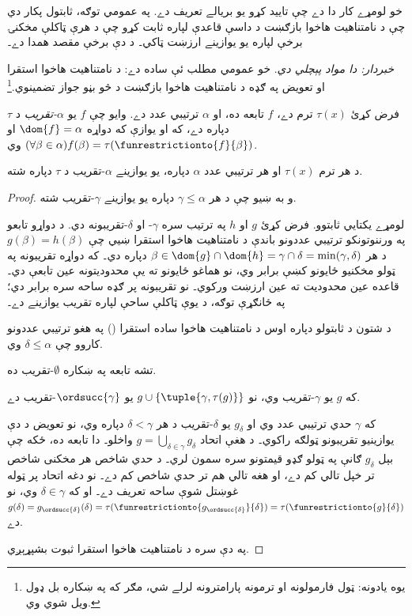 \documentclass[../../../include/open-logic-section]{subfiles}
\begin{document}

خو لومړے کار دا دے چې تاييد کړو
 يو بريالے تعريف دے. په عمومي توګه، ثابتول
پکار دي چې د نامتناهيت هاخوا بازګښت د داسې قاعدې لپاره ثابت کړو
چې د هرې ټاکلې مخکنۍ برخې لپاره يو يوازينے ارزښت ټاکي۔
د دې برخې مقصد همدا دے۔

\emph{خبردار: دا مواد پېچلي دي}. خو عمومي مطلب ئې ساده دے:
د نامتناهيت هاخوا استقرا او تعويض په ګډه د نامتناهيت هاخوا بازګښت د
څو بڼو جواز تضمينوي.\footnote{يوه يادونه: ټول فارمولونه او ترمونه
پارامترونه لرلے شي، مګر که په ښکاره بل ډول ويل شوي وي.}

\begin{defn}
	فرض کړئ $\tau(x)$ ترم دے، $f$ تابعه ده، او $\alpha$ ترتيبي عدد دے.
وايو چې $f$ يو \emph{$\alpha$-تقريب} د $\tau$ دپاره دے، که او يوازې که
دواړه $\dom{f} = \alpha$ او $(\forall \beta \in \alpha)f(\beta) = \tau(\funrestrictionto{f}{\beta})$ وي.
\end{defn}

\begin{lem}
د هر ترم $\tau(x)$ او هر ترتيبي عدد $\alpha$ دپاره، يو يوازينے
$\alpha$-تقريب د $\tau$ دپاره شته.
\end{lem}
\begin{proof}
و به ښيو چې د هر $\gamma \leq \alpha$ دپاره يو يوازينے
$\gamma$-تقريب شته.

لومړے يکتايي ثابتوو. فرض کړئ $g$ او $h$ په ترتيب سره $\gamma$- او
$\delta$-تقريبونه دي. د دواړو تابعو په ورننوتونکو ترتيبي عددونو باندې د نامتناهيت هاخوا استقرا ښيي چې
$g(\beta) = h(\beta)$ د هر $\beta \in \dom{g} \cap \dom{h} =
\gamma \cap \delta = \min(\gamma, \delta)$ دپاره دي۔ که دواړه
تقريبونه په ټولو مخکنيو ځايونو کښې برابر وي، نو هماغو
ځايونو ته يې محدوديتونه عين تابعې دي۔ قاعده عين محدوديت ته
عين ارزښت ورکوي۔ نو تقريبونه پر ګډه ساحه سره برابر دي؛ په
ځانګړې توګه، د يوې ټاکلې ساحې لپاره تقريب يوازينے دے۔

د شتون د ثابتولو دپاره اوس د نامتناهيت هاخوا ساده استقرا
() په هغو ترتيبي عددونو
کاروو چې $\delta \leq \alpha$ وي.

تشه تابعه په ښکاره $\emptyset$-تقريب ده.

که $g$ يو $\gamma$-تقريب وي، نو $g \cup
\{\tuple{\gamma, \tau(g)}\}$ يو $\ordsucc{\gamma}$-تقريب دے.

که $\gamma$ حدي ترتيبي عدد وي او $g_\delta$ يو
$\delta$-تقريب د هر $\delta < \gamma$ دپاره وي، نو تعويض د
دې يوازينيو تقريبونو ټولګه راکوي۔ د هغې اتحاد
$g = \bigcup_{\delta \in \gamma} g_\delta$ واخلو۔
دا تابعه ده، ځکه چې بېل $g_\delta$ ګانې په ټولو ګډو قيمتونو سره سمون
لري۔ د حدي شاخص هر مخکنی شاخص تر خپل تالي کم دے، او
هغه تالي هم تر حدي شاخص کم دے۔ نو دغه اتحاد پر ټوله
غوښتل شوې ساحه تعريف دے۔ او که $\delta \in \gamma$ وي، نو $g(\delta) = g_{\ordsucc{\delta}}(\delta) =
\tau(\funrestrictionto{g_{\ordsucc{\delta}}}{\delta}) =
\tau(\funrestrictionto{g}{\delta})$ دے.

په دې سره د نامتناهيت هاخوا استقرا ثبوت بشپړېږي.
\end{proof}
\end{document}

